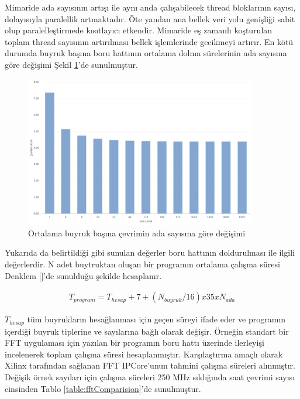 Mimaride ada sayısının artışı ile aynı anda çalışabilecek thread bloklarının sayısı, dolayısıyla paralellik artmaktadır. Öte yandan ana bellek veri yolu genişliği sabit olup paralelleştirmede kısıtlayıcı etkendir. Mimaride eş zamanlı koşturulan toplam thread sayısının artırılması bellek işlemlerinde gecikmeyi artırır. En kötü durumda buyruk başına boru hattının ortalama dolma sürelerinin ada sayısına göre değişimi Şekil \ref{image:fillPipelineWorstVsNumOfIslands}'de sunulmuştur.\par

\begin{figure}[ht]
\centering
\shorthandoff{=}
\includegraphics[width=0.9\textwidth]{gorsel/fillPipelineWorstVsNumOfIslands.png}
\shorthandoff{=}
\caption{Ortalama buyruk başına çevrimin ada sayısına göre değişimi}
\label{image:fillPipelineWorstVsNumOfIslands}
\end{figure}

Yukarıda da belirtildiği gibi sunulan değerler boru hattının doldurulması ile ilgili değerlerdir. N adet buytruktan oluşan bir programın ortalama çalışma süresi Denklem \ref{}'de sunulduğu şekilde hesaplanır. \par

\begin{align} \label{equation:pipelineCycleEstimationWorstCase}
	T_{program}= T_{hesap} + 7 + (N_{buyruk}/16) x 35 x N_{ada}
\end{align}

$T_{hesap}$ tüm buyrukların hesağlanması için geçen süreyi ifade eder ve programın içerdiği buyruk tiplerine ve sayılarına bağlı olarak değişir. Örneğin standart bir FFT uygulaması için yazılan bir programın boru hattı üzerinde ilerleyişi incelenerek toplam çalışma süresi hesaplanmıştır. Karşılaştırma amaçlı olarak Xilinx tarafından sağlanan FFT IPCore'unun tahmini çalışma süreleri alınmıştır. Değişik örnek sayıları için çalışma süreleri 250 MHz sıklığında saat çevrimi sayısı cinsinden Tablo \ref{table:fftComparision}'de sunulmuştur.

